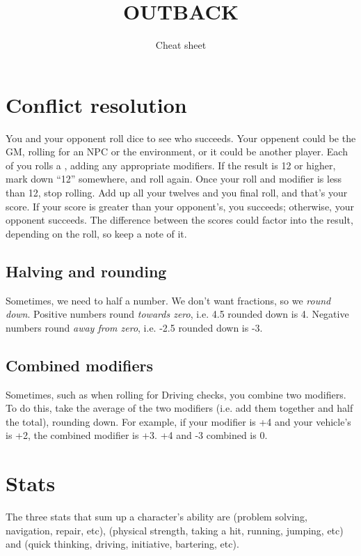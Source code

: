 \documentclass[10pt, a4paper, twocolumn]{article}
\title{\uppercase{Outback}}
\subtitle{Cheat sheet}
\date{}
\begin{document}
\maketitle

\section{Conflict resolution}
You and your opponent roll dice to see who succeeds. Your oppenent could be the
GM, rolling for an NPC or the environment, or it could be another player. Each
of you rolls a , adding any appropriate modifiers. If the result is 12
or higher, mark down ``12'' somewhere, and roll again. Once your roll and
modifier is less than 12, stop rolling. Add up all your twelves and you final
roll, and that's your score. If your score is greater than your
opponent's, you succeeds; otherwise, your opponent succeeds. The difference
between the scores could factor into the result, depending on the roll, so keep
a note of it.

\subsection{Halving and rounding}
Sometimes, we need to half a number. We don't want fractions, so we
\emph{round down}. Positive numbers round \emph{towards zero}, i.e. 4.5
rounded down is 4. Negative numbers round \emph{away from zero}, i.e. -2.5
rounded down is -3.

\subsection{Combined modifiers}
Sometimes, such as when rolling for Driving checks, you combine two
modifiers. To do this, take the average of the two modifiers (i.e. add them
together and half the total), rounding down. For example, if your 
modifier is +4 and your vehicle's  is +2, the combined modifier is +3. 
+4 and -3 combined is 0.

\section{Stats}
The three stats that sum up a character's ability are  (problem
solving, navigation, repair,  etc),  (physical strength, taking a
hit, running, jumping, etc) and  (quick thinking, driving,
initiative, bartering, etc).
\end{document}
